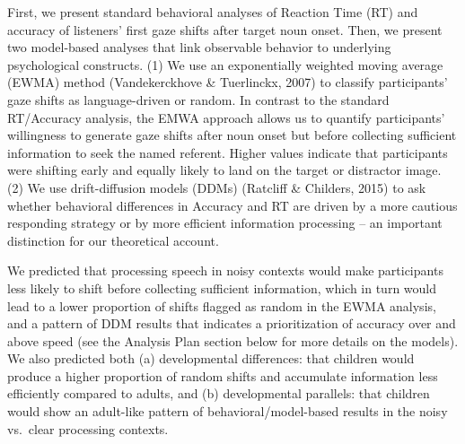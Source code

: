 \documentclass[10pt, letterpaper]{article}
\begin{document}
First, we present standard behavioral analyses of Reaction Time (RT) and
accuracy of listeners' first gaze shifts after target noun onset. Then,
we present two model-based analyses that link observable behavior to
underlying psychological constructs. (1) We use an exponentially
weighted moving average (EWMA) method (Vandekerckhove \& Tuerlinckx,
2007) to classify participants' gaze shifts as language-driven or
random. In contrast to the standard RT/Accuracy analysis, the EMWA
approach allows us to quantify participants' willingness to generate
gaze shifts after noun onset but before collecting sufficient
information to seek the named referent. Higher values indicate that
participants were shifting early and equally likely to land on the
target or distractor image. (2) We use drift-diffusion models (DDMs)
(Ratcliff \& Childers, 2015) to ask whether behavioral differences in
Accuracy and RT are driven by a more cautious responding strategy or by
more efficient information processing -- an important distinction for
our theoretical account.

We predicted that processing speech in noisy contexts would make
participants less likely to shift before collecting sufficient
information, which in turn would lead to a lower proportion of shifts
flagged as random in the EWMA analysis, and a pattern of DDM results
that indicates a prioritization of accuracy over and above speed (see
the Analysis Plan section below for more details on the models). We also
predicted both (a) developmental differences: that children would
produce a higher proportion of random shifts and accumulate information
less efficiently compared to adults, and (b) developmental parallels:
that children would show an adult-like pattern of behavioral/model-based
results in the noisy vs.~clear processing contexts.
\end{document}
